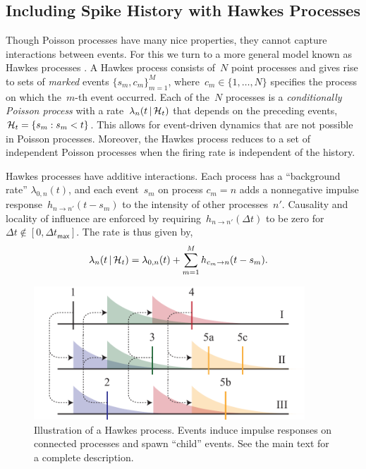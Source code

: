 \subsection{Including Spike History with Hawkes Processes}
Though Poisson processes have many nice properties, they cannot
capture interactions between events. For this we turn to a more
general model known as Hawkes processes \cite{Hawkes-1971}. A Hawkes
process consists of~$N$ point processes and gives rise to sets of
\emph{marked} events $\{s_m,c_m\}_{m=1}^M$,
where~${c_m\in\{1,\ldots,N\}}$ specifies the process on which
the~$m$-th event occurred.  Each of the~$N$ processes is a
\emph{conditionally Poisson process} with a rate~${\lambda_n(t\,|\,
  \mathcal{H}_t)}$ that depends on the preceding
events,~$\mathcal{H}_t=\{s_m:s_m<t\}$.
This allows for event-driven dynamics that are not possible in Poisson
processes.  Moreover, the Hawkes process reduces to a set of
independent Poisson processes when the firing rate is independent of
the history.

Hawkes processes have additive interactions. Each process has a
``background rate'' $\lambda_{0,n}(t)$, and each event~$s_m$ on
process ${c_m=n}$ adds a nonnegative impulse response~$h_{n \to
  n'}(t-s_m)$ to the intensity of other processes~$n'$. Causality and
locality of influence are enforced by requiring~$h_{n \to n'}(\Delta
t)$ to be zero for~${\Delta t \notin[0,\Delta t_{\mathsf{max}}]}$.
The rate is thus given by,
\begin{align}
  \label{eq:hawkes_rate}
  \lambda_n(t \,|\, \mathcal{H}_t)
  &= \lambda_{0,n}(t) + \sum_{m=1}^M h_{c_m \to n}(t - s_m).
\end{align}

\begin{figure}[t]
\centering%
\includegraphics[width=4in]{figures/ch2/Hawkes-wide} 
\vspace{-0.25cm}
\caption[Illustration of a Hawkes process]{Illustration of a Hawkes
  process. Events induce impulse responses on connected processes and
  spawn ``child'' events. See the main text for a complete
  description.}
\label{fig:hawkes}
\end{figure}

